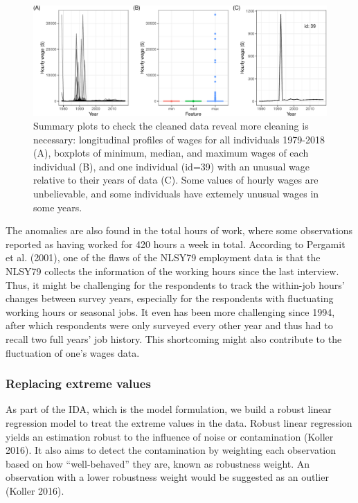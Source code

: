 \documentclass{article}
\begin{document}
\begin{figure}

{\centering \includegraphics[width=1\linewidth]{figures/feature-plot-1} 

}

\caption{Summary plots to check the cleaned data reveal more cleaning is necessary: longitudinal profiles of wages for all individuals 1979-2018 (A), boxplots of minimum, median, and maximum wages of each individual (B), and one individual (id=39) with an unusual wage relative to their years of data (C). Some values of hourly wages are unbelievable, and some individuals have extemely unusual wages in some years.}\label{fig:feature-plot}
\end{figure}

The anomalies are also found in the total hours of work, where some observations reported as having worked for 420 hours a week in total.
According to Pergamit et al. (2001), one of the flaws of the NLSY79 employment data is that the NLSY79 collects the information of the working hours since the last interview. Thus, it might be challenging for the respondents to track the within-job hours' changes between survey years, especially for the respondents with fluctuating working hours or seasonal jobs. It even has been more challenging since 1994, after which respondents were only surveyed every other year and thus had to recall two full years' job history. This shortcoming might also contribute to the fluctuation of one's wages data.

\hypertarget{censor}{%
\subsubsection{Replacing extreme values}\label{censor}}

As part of the IDA, which is the model formulation, we build a robust linear regression model to treat the extreme values in the data. Robust linear regression yields an estimation robust to the influence of noise or contamination (Koller 2016). It also aims to detect the contamination by weighting each observation based on how ``well-behaved'' they are, known as robustness weight. An observation with a lower robustness weight would be suggested as an outlier (Koller 2016).
\end{document}
